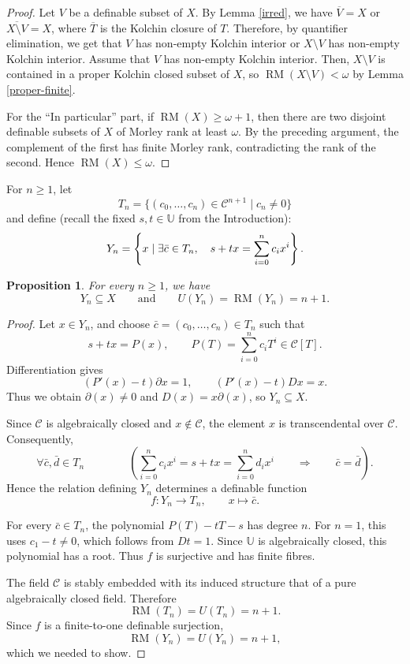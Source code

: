 \documentclass[10pt,a4paper]{amsart}
\newtheorem{proposition}[theorem]{Proposition}
\newcommand{\RM}{\operatorname{RM}}
\newcommand{\Ucal}{{\mathds{U}}}
\newcommand{\C}{\mathcal C}
\newcommand{\Uu}{{\mathds{U}}}
\begin{document}
\begin{proof}
Let $V$ be a definable subset of $X$. By Lemma \ref{irred}, we have $\overline{V}=X$ or $\overline{X\setminus V}=X$, where $\overline{T}$ is the Kolchin closure of $T$. Therefore, by quantifier elimination, we get that $V$ has non-empty Kolchin interior or $X\setminus V$ has non-empty Kolchin interior. Assume that $V$ has non-empty Kolchin interior. Then, $X\setminus V$ is contained in a proper Kolchin closed subset of $X$, so $\RM(X\setminus V)<\omega$ by Lemma \ref{proper-finite}.

For the ``In particular'' part, if $\RM(X)\geqslant\omega+1$, then there are two disjoint
definable subsets of $X$ of Morley rank at least $\omega$.
By the preceding argument, the complement of the first
has finite Morley rank, contradicting the rank of the
second. Hence $\RM(X)\leqslant\omega$.
\end{proof}
For $n\geqslant1$, let
\[
 T_n=\{(c_0,\ldots,c_n)\in\C^{n+1}\mid c_n\neq0\}
\]
and define (recall the fixed $s,t\in \Uu$ from the Introduction):
\begin{equation}\label{Yn}
 Y_n=\left\{x\mid \exists\bar c\in T_n,\quad
          s+tx=\sum_{i=0}^{n}c_i x^i\right\}.
          \notag
\end{equation}
\begin{proposition}\label{exceptional-rank}
For every $n\geqslant1$, we have
\[
Y_n\subseteq X\qquad \text{and}\qquad U(Y_n)=\RM(Y_n)=n+1.
\]
\end{proposition}
\begin{proof}
Let $x\in Y_n$, and choose $\bar c=(c_0,\ldots,c_n)\in T_n$ such that
\[
s+tx=P(x),
\qquad
P(T)=\sum_{i=0}^n c_iT^i\in \C[T].
\]
Differentiation gives
\[
(P'(x)-t)\partial x=1,
\qquad
(P'(x)-t)Dx=x.
\]
Thus we obtain $\partial (x)\neq0$ and $D(x)=x\partial (x)$, so $Y_n\subseteq X$.

Since $\C$ is algebraically closed and $x\notin\C$,
the element $x$ is transcendental over $\C$.
Consequently,
\[
\forall \bar c,\bar d\in T_n\qquad \qquad \left(
\sum_{i=0}^n c_i x^i
=s+tx
=\sum_{i=0}^n d_i x^i
\qquad \Longrightarrow\qquad \bar c=\bar d\right).
\]
Hence the relation defining
$Y_n$ determines a definable function
\[
f:Y_n\longrightarrow T_n,\qquad x\longmapsto\bar c.
\]

For every $\bar c\in T_n$, the polynomial
$P(T)-tT-s$ has degree $n$. For $n=1$, this uses
$c_1-t\neq0$, which follows from $Dt=1$.
Since $\Ucal$ is algebraically closed, this polynomial
has a root. Thus $f$ is surjective and has finite fibres.

The field $\C$ is stably embedded with its induced
structure that of a pure algebraically closed field.
Therefore
\[
\RM(T_n)=U(T_n)=n+1.
\]
Since $f$ is a finite-to-one definable surjection,
\[
\RM(Y_n)=U(Y_n)=n+1,
\]
which we needed to show.
\end{proof}
\end{document}
